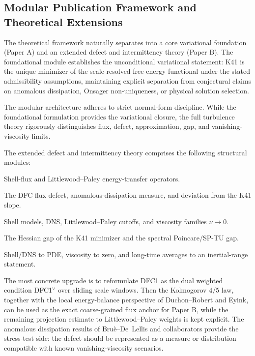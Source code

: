 \documentclass[12pt,a4paper]{article}
\theoremstyle{breakdef}
\theoremstyle{breakplain}
\theoremstyle{breakdef}
\begin{document}
\subsection{Modular Publication Framework and Theoretical Extensions}
\label{subsec:zookeeper-turbulence-transfer}

The theoretical framework naturally separates into a core variational foundation
(Paper A) and an extended defect and intermittency theory (Paper B). The foundational
module establishes the unconditional variational statement: K41 is the unique minimizer
of the scale-resolved free-energy functional under the stated admissibility
assumptions, maintaining explicit separation from conjectural claims on anomalous
dissipation, Onsager non-uniqueness, or physical solution selection.

The modular architecture adheres to strict normal-form discipline. While the foundational
formulation provides the variational closure, the full turbulence theory rigorously
distinguishes flux, defect, approximation, gap, and vanishing-viscosity limits.

The extended defect and intermittency theory comprises the following structural modules:
\begin{description}[style=nextline,leftmargin=3.2cm,labelwidth=2.8cm]
  \item[Operator/form.] Shell-flux and Littlewood--Paley energy-transfer
  operators.
  \item[Defect.] The DFC flux defect, anomalous-dissipation measure, and
  deviation from the K41 slope.
  \item[Approximation.] Shell models, DNS, Littlewood--Paley cutoffs, and
  viscosity families $\nu\to0$.
  \item[Gap.] The Hessian gap of the K41 minimizer and the spectral
  Poincare/SP-TU gap.
  \item[Limit.] Shell/DNS to PDE, viscosity to zero, and long-time averages
  to an inertial-range statement.
\end{description}

The most concrete upgrade is to reformulate DFC1 as the dual weighted
condition DFC1$^\vee$ over sliding scale windows. Then the Kolmogorov
$4/5$ law, together with the local energy-balance perspective of
Duchon--Robert and Eyink, can be used as the exact coarse-grained flux
anchor for Paper B, while the remaining projection estimate to
Littlewood--Paley weights is kept explicit. The anomalous dissipation
results of Bru\`e--De~Lellis and collaborators provide the stress-test
side: the defect should be represented as a measure or distribution
compatible with known vanishing-viscosity scenarios.
\end{document}
